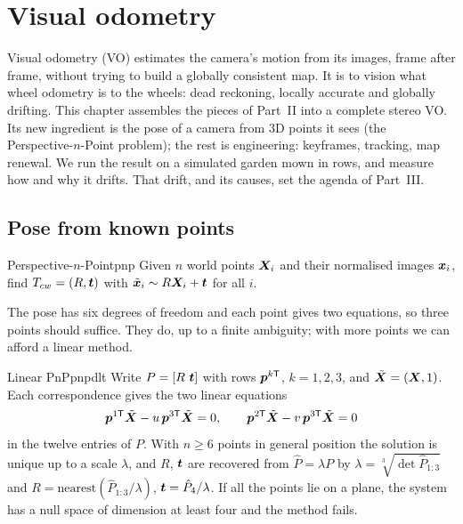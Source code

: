 \chapter{Visual odometry}
\label{ch:vo}

Visual odometry (VO) estimates the camera's motion from its images,
frame after frame, without trying to build a globally consistent map.
It is to vision what wheel odometry is to the wheels: dead reckoning,
locally accurate and globally drifting. This chapter assembles the
pieces of Part~II into a complete stereo VO. Its new ingredient is the
pose of a camera from 3D points it sees (the Perspective-$n$-Point
problem); the rest is engineering: keyframes, tracking, map renewal. We
run the result on a simulated garden mown in rows, and measure how and
why it drifts. That drift, and its causes, set the agenda of Part~III.

\section{Pose from known points}

\begin{definition}{Perspective-$n$-Point}{pnp}
Given $n$ world points $\bm{X}_i$ and their normalised images
$\bm{x}_i$, find $T_{cw}=(R,\bm{t})$ with $\tilde{\bm{x}}_i\sim
R\bm{X}_i+\bm{t}$ for all $i$.
\end{definition}

The pose has six degrees of freedom and each point gives two equations,
so three points should suffice. They do, up to a finite ambiguity; with
more points we can afford a linear method.

\begin{proposition}{Linear PnP}{pnpdlt}
Write $P=[R\ \bm{t}]$ with rows $\bm{p}^{k\mathsf T}$, $k=1,2,3$,
and $\tilde{\bm{X}}=(\bm{X},1)$. Each correspondence gives the two
linear equations
\[
\bm{p}^{1\mathsf T}\tilde{\bm{X}}-u\,\bm{p}^{3\mathsf T}
\tilde{\bm{X}}=0,\qquad
\bm{p}^{2\mathsf T}\tilde{\bm{X}}-v\,\bm{p}^{3\mathsf T}
\tilde{\bm{X}}=0
\]
in the twelve entries of $P$. With $n\ge6$ points in general position
the solution is unique up to a scale $\lambda$, and $R$, $\bm{t}$ are
recovered from $\hat P=\lambda P$ by $\lambda=\sqrt[3]{\det\hat P_{1:3}}$
and $R=\mathrm{nearest}(\hat P_{1:3}/\lambda)$, $\bm{t}=\hat
P_4/\lambda$. If all the points lie on a plane, the system has a null
space of dimension at least four and the method fails.
\end{proposition}


